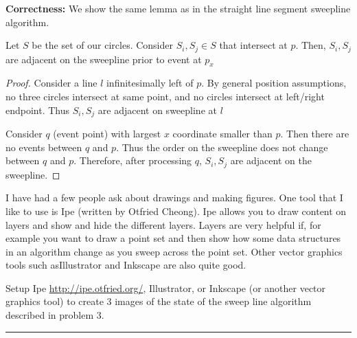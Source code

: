 \documentclass[11pt]{article}
\begin{document}
\textbf{Correctness: } We show the same lemma as in the straight line segment sweepline algorithm.

\begin{lemma}
    Let $S$ be the set of our circles. Consider $S_i, S_j \in S$ that intersect at $p$.
    Then, $S_i, S_j$ are adjacent on the sweepline prior to event at $p_x$
\end{lemma}

\begin{proof}
    Consider a line $l$ infinitesimally left of $p$. By general position assumptions, 
    no three circles intersect at same point, and no circles intersect at left/right endpoint.
    Thus $S_i, S_j$ are adjacent on sweepline at $l$

    Consider $q$ (event point) with largest $x$ coordinate smaller than $p$.
    Then there are no events between $q$ and $p$. Thus the order on the sweepline does not change between $q$ and $p$.
    Therefore, after processing $q$, $S_i, S_j$ are adjacent on the sweepline.
\end{proof}



I have had a few people ask about drawings and making figures.  One tool that I
like to use is Ipe (written by Otfried Cheong).  Ipe allows you to draw content
on layers and show and hide the different layers.  Layers are very helpful if,
for example you want to draw a point set and then show how some data structures
in an algorithm change as you sweep across the point set.
Other vector graphics tools such asIllustrator and Inkscape are also quite good.

Setup Ipe \url{http://ipe.otfried.org/}, Illustrator, or Inkscape
(or another vector graphics tool)
to create 3 images of the state of the sweep line algorithm
described in problem 3.

\hrule
\end{document}
